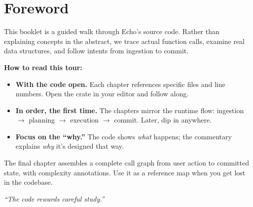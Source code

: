 
\chapter*{Foreword}

This booklet is a guided walk through Echo's source code. Rather than explaining
concepts in the abstract, we trace actual function calls, examine real data
structures, and follow intents from ingestion to commit.

\bigskip
\textbf{How to read this tour:}
\begin{itemize}
  \item \textbf{With the code open.} Each chapter references specific files and
        line numbers. Open the crate in your editor and follow along.
  \item \textbf{In order, the first time.} The chapters mirror the runtime flow:
        ingestion $\to$ planning $\to$ execution $\to$ commit. Later, dip in
        anywhere.
  \item \textbf{Focus on the ``why.''} The code shows \emph{what} happens; the
        commentary explains \emph{why} it's designed that way.
\end{itemize}

\bigskip
The final chapter assembles a complete call graph from user action to committed
state, with complexity annotations. Use it as a reference map when you get lost
in the codebase.

\bigskip
\begin{flushright}
\textit{``The code rewards careful study.''}
\end{flushright}

\clearpage
